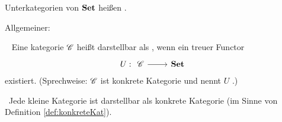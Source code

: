 \begin{bemerkung}
	Unterkategorien von $\operatorname{\mathbf{Set}}$ heißen .
\end{bemerkung}
Allgemeiner:
\begin{definition}\
	\label{def:konkreteKat}
	Eine kategorie $\mathscr C$ heißt darstellbar als , wenn ein treuer Functor
	\begin{align*}
		U: \begin{tikzcd}[ampersand replacement=\&] \Cat \arrow[r]\& \Set \end{tikzcd}
	\end{align*}
	existiert. (Sprechweise: $\mathscr C$ ist konkrete Kategorie und nennt $U$ .)
\end{definition}
\begin{satz}\
	Jede kleine Kategorie ist darstellbar als konkrete Kategorie (im Sinne von Definition \ref{def:konkreteKat}).
\end{satz}
